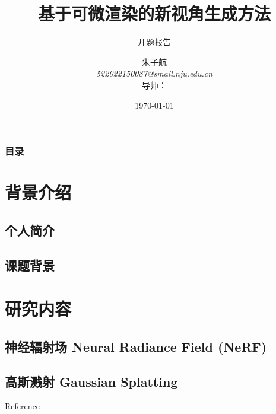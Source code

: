 \documentclass{njupre/njupre}
\title[基于可微渲染的新视角生成方法]{基于可微渲染的新视角生成方法}
\subtitle{ 开题报告 }
\author[朱子航]{\texorpdfstring{
    朱子航 \\ \smallskip 
    \textit{522022150087@smail.nju.edu.cn} \\ \smallskip
    导师：}{}
}
\date[\today]{\texorpdfstring{\today}{}}
\begin{document}
\begin{frame}
    \titlepage
\end{frame}
\begin{frame}
    \frametitle{目录}
    \tableofcontents
\end{frame}

\section{背景介绍}

\subsection{个人简介}




\subsection{课题背景}

\section{研究内容}
\subsection{神经辐射场 Neural Radiance Field (NeRF)}

\subsection{高斯溅射 Gaussian Splatting}


% 
% 
% 

\begin{frame}[allowframebreaks]{Reference}
    
    
\end{frame}
\end{document}
